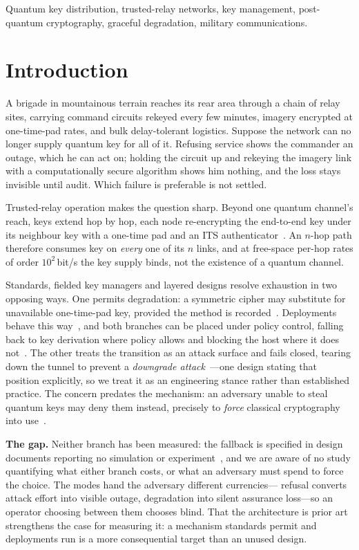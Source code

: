 \documentclass[conference]{IEEEtran}
\begin{document}
\begin{IEEEkeywords}
Quantum key distribution, trusted-relay networks, key management, post-quantum
cryptography, graceful degradation, military communications.
\end{IEEEkeywords}

\section{Introduction}
A brigade in mountainous terrain reaches its rear area through a chain of relay
sites, carrying command circuits rekeyed every few minutes, imagery encrypted at
one-time-pad rates, and bulk delay-tolerant logistics. Suppose the network can no
longer supply quantum key for all of it. Refusing service shows the commander an
outage, which he can act on; holding the circuit up and rekeying the imagery link
with a computationally secure algorithm shows him nothing, and the loss stays
invisible until audit. Which failure is preferable is not settled.

Trusted-relay operation makes the question sharp. Beyond one quantum channel's
reach, keys extend hop by hop, each node re-encrypting the end-to-end key under its
neighbour key with a one-time pad and an ITS authenticator~\cite{salvail}. An
$n$-hop path therefore consumes key on \emph{every} one of its $n$ links, and at
free-space per-hop rates of order $10^{2}$\,bit/s the key supply binds, not the
existence of a quantum channel.

Standards, fielded key managers and layered designs resolve exhaustion in two
opposing ways. One permits degradation: a symmetric cipher may substitute for
unavailable one-time-pad key, provided the method is recorded~\cite{itu3803}.
Deployments behave this way~\cite{makris}, and both branches can be placed under
policy control, falling back to key derivation where policy allows and blocking the
host where it does not~\cite{tysowski}. The other treats the transition as an
attack surface and fails closed, tearing down the tunnel to prevent a
\emph{downgrade attack}~\cite{spooren}---one design stating that position
explicitly, so we treat it as an engineering stance rather than established
practice. The concern predates the mechanism: an adversary unable to steal quantum
keys may deny them instead, precisely to \emph{force} classical cryptography into
use~\cite{schartner}.

\textbf{The gap.} Neither branch has been measured: the fallback is specified in
design documents reporting no simulation or experiment~\cite{tysowski}, and we are
aware of no study quantifying what either branch costs, or what an adversary must
spend to force the choice. The modes hand the adversary different currencies---
refusal converts attack effort into visible outage, degradation into silent
assurance loss---so an operator choosing between them chooses blind. That the
architecture is prior art strengthens the case for measuring it: a mechanism
standards permit and deployments run is a more consequential target than an unused
design.
\end{document}

